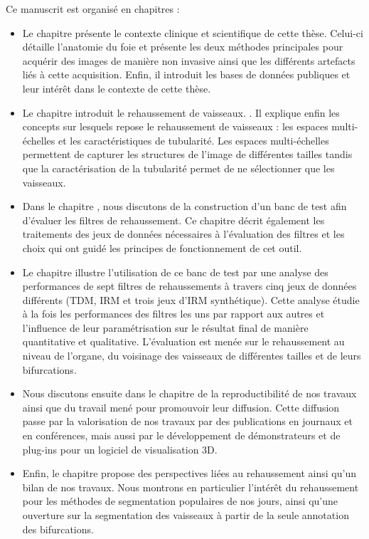 Ce manuscrit est organisé en \chapTotal{} chapitres : 

\begin{itemize}
\item Le chapitre \chapContextN{} présente le contexte clinique et scientifique de cette thèse. Celui-ci détaille l'anatomie du foie et présente les deux méthodes principales pour acquérir des images de manière non invasive ainsi que les différents artefacts liés à cette acquisition. Enfin, il introduit les bases de données publiques et leur intérêt dans le contexte de cette thèse.

\item Le chapitre \chapSOTAN{} introduit le rehaussement de vaisseaux. . Il explique enfin les concepts sur lesquels repose le rehaussement de vaisseaux : les espaces multi-échelles et les caractéristiques de tubularité. Les espaces multi-échelles permettent de capturer les structures de l'image de différentes tailles tandis que la caractérisation de la tubularité permet de ne sélectionner que les vaisseaux.

\item Dans le chapitre \chapBenchN, nous discutons de la construction d'un banc de test afin d'évaluer les filtres de rehaussement. Ce chapitre décrit également les traitements des jeux de données nécessaires à l'évaluation des filtres et les choix qui ont guidé les principes de fonctionnement de cet outil.

\item Le chapitre \chapAnalysisN{} illustre l'utilisation de ce banc de test par une analyse des performances de sept filtres de rehaussements à travers cinq jeux de données différents (TDM, IRM et trois jeux d'IRM synthétique). Cette analyse étudie à la fois les performances des filtres les uns par rapport aux autres et l'influence de leur paramétrisation sur le résultat final de manière quantitative et qualitative. L'évaluation est menée sur le rehaussement au niveau de l'organe, du voisinage des vaisseaux de différentes tailles et de leurs bifurcations. 

\item Nous discutons ensuite dans le chapitre \chapReproN{} de la reproductibilité de nos travaux ainsi que du travail mené pour promouvoir leur diffusion. Cette diffusion passe par la valorisation de nos travaux par des publications en journaux et en conférences, mais aussi par le développement de démonstrateurs et de plug-ins pour un logiciel de visualisation 3D.

\item Enfin, le chapitre \chapEndN{} propose des perspectives liées au rehaussement ainsi qu'un bilan de nos travaux. Nous montrons en particulier l'intérêt du rehaussement pour les méthodes de segmentation populaires de nos jours, ainsi qu'une ouverture sur la segmentation des vaisseaux à partir de la seule annotation des bifurcations.
\end{itemize}
    